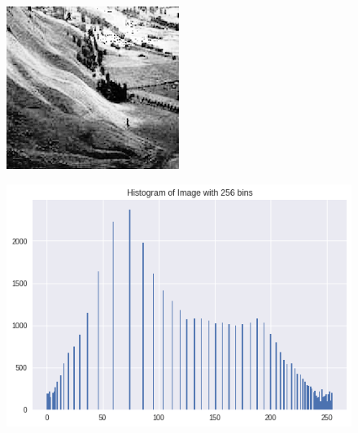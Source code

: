 \documentclass{article}
\begin{document}
\begin{enumerate}[label=B\arabic*)]
\begin{figure}[h!]
\begin{minipage}{0.32\textwidth}
			\end{minipage}
			\hfill
			\begin{minipage}{0.32\textwidth}
				\centering
				\includegraphics[width=0.9\linewidth]{Hist/Equalized/Hist1_equalized.png}
			\end{minipage}
		\end{figure}
		\begin{figure}[h!]
			\begin{minipage}{0.24\textwidth}
				\centering
				\includegraphics[width=0.9\linewidth]{Hist/Equalized/Histogram(bin-256).png}
	            					\end{minipage}

\end{figure}
\end{enumerate}
\end{document}
